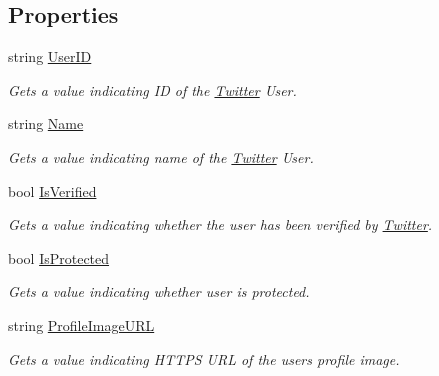 \subsection*{Properties}
\begin{DoxyCompactItemize}
\item 
string \hyperlink{class_voxel_busters_1_1_native_plugins_1_1_twitter_user_a385d641024c455dc9b5eb30c98c81ace}{User\+I\+D}
\begin{DoxyCompactList}\small\item\em Gets a value indicating I\+D of the \hyperlink{class_voxel_busters_1_1_native_plugins_1_1_twitter}{Twitter} User. \end{DoxyCompactList}\item 
string \hyperlink{class_voxel_busters_1_1_native_plugins_1_1_twitter_user_a7ee9065718e6628dc7791b756fa6c0f9}{Name}
\begin{DoxyCompactList}\small\item\em Gets a value indicating name of the \hyperlink{class_voxel_busters_1_1_native_plugins_1_1_twitter}{Twitter} User. \end{DoxyCompactList}\item 
bool \hyperlink{class_voxel_busters_1_1_native_plugins_1_1_twitter_user_a56786d050e742ceab749ee116da69c24}{Is\+Verified}
\begin{DoxyCompactList}\small\item\em Gets a value indicating whether the user has been verified by \hyperlink{class_voxel_busters_1_1_native_plugins_1_1_twitter}{Twitter}. \end{DoxyCompactList}\item 
bool \hyperlink{class_voxel_busters_1_1_native_plugins_1_1_twitter_user_a230cd87f736815fe5dfe96ba6adf3b5e}{Is\+Protected}
\begin{DoxyCompactList}\small\item\em Gets a value indicating whether user is protected. \end{DoxyCompactList}\item 
string \hyperlink{class_voxel_busters_1_1_native_plugins_1_1_twitter_user_ae3ee0ac1ef3df0593fec9086106c541b}{Profile\+Image\+U\+R\+L}
\begin{DoxyCompactList}\small\item\em Gets a value indicating H\+T\+T\+P\+S U\+R\+L of the user\textquotesingle{}s profile image. \end{DoxyCompactList}\end{DoxyCompactItemize}


